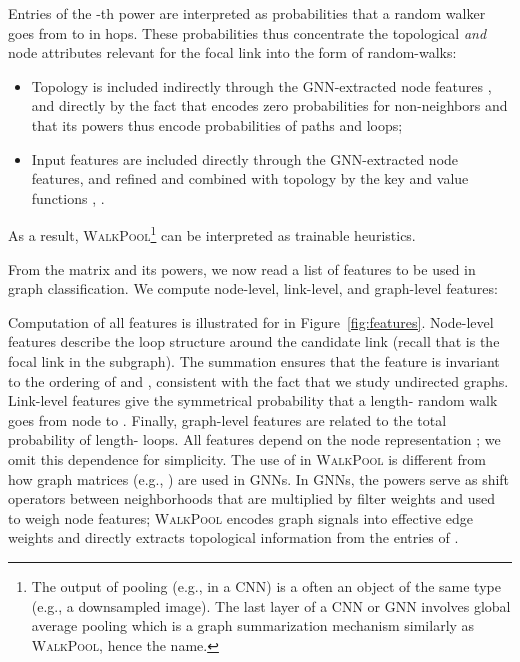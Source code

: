 \documentclass[11pt]{article}
\newcommand{\walkpool}{\textsc{WalkPool}\xspace}
\newcommand{\UPDATE}[1]{\textcolor{WowColor}{{#1}}}
\renewcommand{\UPDATE}[1]{#1}
\begin{document}
Entries of the -th power  are interpreted as    probabilities that a random walker goes from   to  in  hops. These probabilities thus concentrate the topological \emph{and} node attributes relevant for the focal link into the form of random-walks:
\vspace{-1mm}
\begin{itemize}
    \item Topology is included indirectly through the GNN-extracted node features , and directly by the fact that  encodes zero probabilities for non-neighbors and that its powers thus encode probabilities of paths and loops;
    \item Input features are included directly through the GNN-extracted node features, and refined and combined with topology by the key and value functions , .
\end{itemize}
As a result, \walkpool\footnote{The output of pooling (e.g., in a CNN) is a often an object of the same type (e.g., a downsampled image). The last layer of a  CNN or GNN involves global average pooling which is a graph summarization mechanism similarly as \walkpool, hence the name.} can be interpreted as trainable heuristics.

From the matrix  and its powers, we now read a list of features to be used in graph classification. We compute node-level, link-level, and graph-level features:

Computation of all features is illustrated for  in Figure~\ref{fig:features}. Node-level features  describe the loop structure around the candidate link (recall that  is the focal link in the subgraph). The summation ensures that the feature is invariant to the ordering of  and , consistent with the fact that we study undirected graphs. Link-level features  give the symmetrical probability that a length- random walk goes from node  to . Finally, graph-level features  are related to the total probability of length- loops. All features depend on the node representation ; we omit this dependence for simplicity. \UPDATE{The use of   in \walkpool is different from how graph matrices (e.g., ) are used in GNNs. In GNNs, the powers  serve as shift operators between neighborhoods that are multiplied by filter weights and used to weigh node features; \walkpool encodes graph signals into effective edge weights and directly extracts topological information from the entries of .}
\vspace{-1mm}
\end{document}
